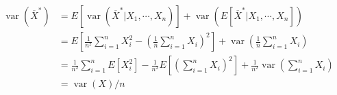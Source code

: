 \begin{solution}
    \begin{equation*}
    \begin{aligned} \operatorname{var}\left(\overline{X}^{*}\right) &=E\left[\operatorname{var}\left(\overline{X}^{*} | X_{1}, \cdots, X_{n}\right)\right]+\operatorname{var}\left(E\left[\overline{X}^{*} | X_{1}, \cdots, X_{n}\right]\right) \\ &=E\left[\frac{1}{n^2} \sum_{i=1}^{n} X_{i}^{2}-\left(\frac{1}{n} \sum_{i=1}^{n} X_{i}\right)^{2}\right]+\operatorname{var}\left(\frac{1}{n} \sum_{i=1}^{n} X_{i}\right) \\ &=\frac{1}{n^2} \sum_{i=1}^{n} E\left[X_{i}^{2}\right]-\frac{1}{n^2} E\left[\left(\sum_{i=1}^{n} X_{i}\right)^{2}\right]+\frac{1}{n^2} \operatorname{var}\left(\sum_{i=1}^{n} X_{i}\right) \\ &=\operatorname{var}(X) / n \end{aligned}
    \end{equation*}
\end{solution}